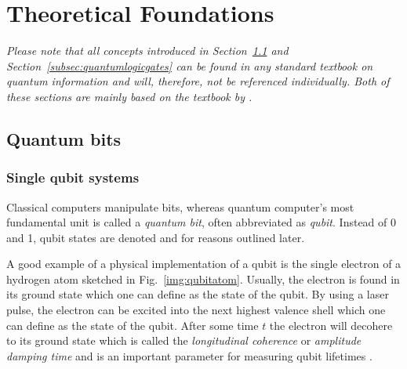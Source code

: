 \chapter{Theoretical Foundations}\label{sec:theory}
\emph{Please note that all concepts introduced in Section~\ref{subsec:qubits} and Section~\ref{subsec:quantumlogicgates} can be found in any standard textbook on quantum information and will, therefore, not be referenced individually. Both of these sections are mainly based on the textbook by .}
\section{Quantum bits}
\label{subsec:qubits}
\subsection{Single qubit systems}
\label{subsubsec:qubits}

Classical computers manipulate bits, whereas quantum computer's most fundamental unit is called a \emph{quantum bit}, often abbreviated as \emph{qubit}. Instead of 0 and 1, qubit states are denoted \0 and \1 for reasons outlined later.

A good example of a physical implementation of a qubit is the single electron of a hydrogen atom sketched in Fig.~\ref{img:qubitatom}. Usually, the electron is found in its ground state which one can define as the \0 state of the qubit. By using a laser pulse, the electron can be excited into the next highest valence shell which one can define as the \1 state of the qubit. After some time $t$ the electron will decohere to its ground state \0 which is called the \emph{longitudinal coherence} or \emph{amplitude damping time} and is an important parameter for measuring qubit lifetimes \cite{chuanglecturenotes}.

